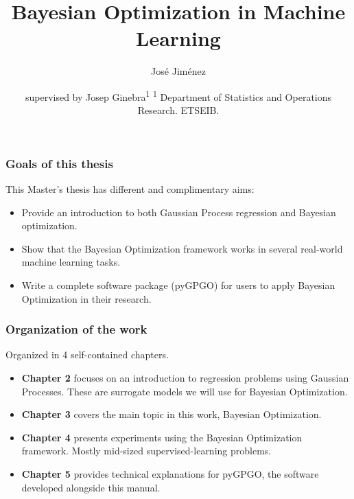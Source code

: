 \documentclass[10pt,usenames,dvipsnames]{beamer}
\author{José Jiménez}
\title{Bayesian Optimization in Machine Learning}
\institute{Master's Thesis \vfill Master's degree in Statistics and Operations Research}
\date{\tiny supervised by Josep Ginebra\textsuperscript{1}\vfill
	\textsuperscript{1} Department of Statistics and Operations Research. ETSEIB.}
\begin{document}
	\maketitle
	
	\begin{frame}
		\frametitle{Goals of this thesis}
		This Master's thesis has different and complimentary aims:
		
		\begin{itemize}
			\item Provide an introduction to both Gaussian Process regression and Bayesian optimization. 
			\item Show that the Bayesian Optimization framework works in several real-world machine learning tasks.
			\item Write a complete software package (pyGPGO) for users to apply Bayesian Optimization in their research.
		\end{itemize}
	\end{frame}
	
	\begin{frame}
		\frametitle{Organization of the work}
		Organized in 4 self-contained chapters.
		\begin{itemize}
			\item \textbf{Chapter 2} focuses on an introduction to regression problems using Gaussian Processes. These are surrogate models we will use for Bayesian Optimization.
			\item \textbf{Chapter 3} covers the main topic in this work, Bayesian Optimization.
			\item \textbf{Chapter 4} presents experiments using the Bayesian Optimization framework. Mostly mid-sized supervised-learning problems.
			\item \textbf{Chapter 5} provides technical explanations for pyGPGO, the software developed alongside this manual.
		\end{itemize}
	\end{frame}
	
\end{document}
